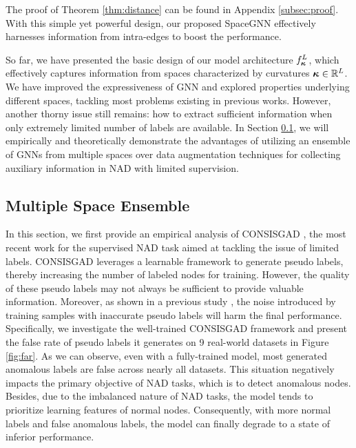 The proof of Theorem \ref{thm:distance} can be found in Appendix \ref{subsec:proof}. With this simple yet powerful design, our proposed SpaceGNN effectively harnesses information from intra-edges to boost the performance. 

So far, we have presented the basic design of our model architecture $f_{\boldsymbol{\kappa}}^L$, which effectively captures information from spaces characterized by curvatures $\boldsymbol{\kappa}\in \mathbb{R}^L$. We have improved the expressiveness of GNN and explored properties underlying different spaces, tackling most problems existing in previous works. However, another thorny issue still remains: how to extract sufficient information when only extremely limited number of labels are available. In Section \ref{subsec:MSE}, we will empirically and theoretically demonstrate the advantages of utilizing an ensemble of GNNs from multiple spaces over data augmentation techniques for collecting auxiliary information in NAD with limited supervision. 

\subsection{Multiple Space Ensemble}
\label{subsec:MSE}



In this section, we first provide an empirical analysis of CONSISGAD \citep{consisgad24chen}, the most recent work for the supervised NAD task aimed at tackling the issue of limited labels. CONSISGAD leverages a learnable framework to generate pseudo labels, thereby increasing the number of labeled nodes for training. However, the quality of these pseudo labels may not always be sufficient to provide valuable information. Moreover, as shown in a previous study \citep{dataaug23wang}, the noise introduced by training samples with inaccurate pseudo labels will harm the final performance. Specifically, we investigate the well-trained CONSISGAD framework and present the false rate of pseudo labels it generates on 9 real-world datasets in Figure \ref{fig:far}. 
As we can observe, even with a fully-trained model, most generated anomalous labels are false across nearly all datasets. This situation negatively impacts the primary objective of NAD tasks, which is to detect anomalous nodes. Besides, due to the imbalanced nature of NAD tasks, the model tends to prioritize learning features of normal nodes. Consequently, with more normal labels and false anomalous labels, the model can finally degrade to a state of inferior performance. 

